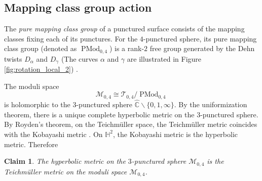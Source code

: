 \documentclass[UTF8]{amsart}
\newtheorem{claim}[theorem]{Claim}
\numberwithin{equation}{section}
\theoremstyle{definition}
\theoremstyle{example}
\theoremstyle{remark}
\DeclareMathOperator{\pmodo}{PMod}
\begin{document}
\subsection{Mapping class group action}
The \emph{pure mapping class group} of a punctured surface consists of the mapping classes fixing each of its punctures.
For the $4$-punctured sphere, its pure mapping class group (denoted as $\pmodo_{0,4}$) is a rank-$2$ free group generated by the Dehn twists $D_{\alpha}$ and $D_{\gamma}$ (The curves $\alpha$ and $\gamma$ are illustrated in Figure \ref{fig:rotation_local_2}) \cite[Section 4.2.4]{farb2011primer}.

The moduli space $$\mathcal{M}_{0,4} \cong \mathcal{T}_{0,4} / \pmodo_{0,4}$$ is holomorphic to the $3$-punctured sphere $\hat{\mathbb{C}} \backslash \{0, 1, \infty\}$. By the uniformization theorem, there is a unique complete hyperbolic metric on the $3$-punctured sphere. By Royden's theorem, on the Teichm\"uller space, the Teichm\"uller metric coincides with the Kobayashi metric \cite[Theorem 3]{royden1971automorphisms}. On $\mathbb{H}^2$, the Kobayashi metric is the hyperbolic metric. Therefore
\begin{claim}
 The hyperbolic metric on the $3$-punctured sphere $\mathcal{M}_{0,4}$ is the Teichm\"uller metric on the moduli space $\mathcal{M}_{0,4}$. 
 \label{claim:dt_dk_dh}
\end{claim}
\end{document}
